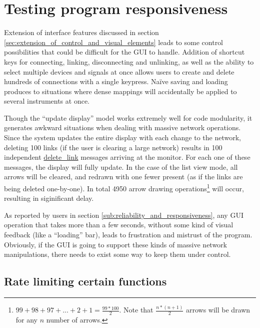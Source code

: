 	

\section{Testing program responsiveness} %
\label{sec:testing_program_responsiveness}

Extension of interface features discussed in section \ref{sec:extension_of_control_and_visual_elements} leads to some control possibilities that could be difficult for the GUI to handle. Addition of shortcut keys for connecting, linking, disconnecting and unlinking, as well as the ability to select multiple devices and signals at once allows users to create and delete hundreds of connections with a single keypress. Na\"{i}ve saving and loading produces to situations where dense mappings will accidentally be applied to several instruments at once.

Though the ``update display'' model works extremely well for code modularity, it generates awkward situations when dealing with massive network operations. Since the system updates the entire display with each change to the network, deleting 100 links (if the user is clearing a large network) results in 100 independent \url{delete_link} messages arriving at the monitor. For each one of these messages, the display will fully update. In the case of the list view mode, all arrows will be cleared, and redrawn with one fewer present (as if the links are being deleted one-by-one). In total 4950 arrow drawing operations\footnote{$99 + 98 + 97 + ... + 2 + 1 = \frac{99*100}{2}$. Note that $\frac{n*(n+1)}{2}$ arrows will be drawn for any $n$ number of arrows.} will occur, resulting in siginificant delay. 

As reported by users in section \ref{sub:reliability_and_responsiveness}, any GUI operation that takes more than a few seconds, without some kind of visual feedback (like a ``loading'' bar), leads to frustration and mistrust of the program. Obviously, if the GUI is going to support these kinds of massive network manipulations, there needs to exist some way to keep them under control.

	\subsection{Rate limiting certain functions} %
	\label{sub:rate_limiting_certain_functions}


